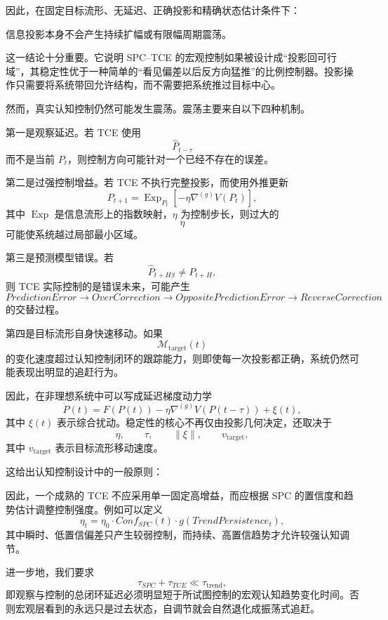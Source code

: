 因此，在固定目标流形、无延迟、正确投影和精确状态估计条件下：
\begin{statementbox}
信息投影本身不会产生持续扩幅或有限幅周期震荡。
\end{statementbox}

这一结论十分重要。它说明 SPC--TCE 的宏观控制如果被设计成``投影回可行域''，其稳定性优于一种简单的``看见偏差以后反方向猛推''的比例控制器。投影操作只需要将系统带回允许结构，而不需要把系统推过目标中心。

然而，真实认知控制仍然可能发生震荡。震荡主要来自以下四种机制。

第一是观察延迟。若 TCE 使用
\[
\hat P_{t-\tau}
\]
而不是当前 $P_t$，则控制方向可能针对一个已经不存在的误差。

第二是过强控制增益。若 TCE 不执行完整投影，而使用外推更新
\[
P_{t+1}
=
\operatorname{Exp}_{P_t}
\left[
-\eta
\nabla^{(g)}
V(P_t)
\right],
\]
其中 $\operatorname{Exp}$ 是信息流形上的指数映射，$\eta$ 为控制步长，则过大的
\[
\eta
\]
可能使系统越过局部最小区域。

第三是预测模型错误。若
\[
\widehat P_{t+H|t}
\neq
P_{t+H},
\]
则 TCE 实际控制的是错误未来，可能产生
\[
PredictionError
\rightarrow
OverCorrection
\rightarrow
OppositePredictionError
\rightarrow
ReverseCorrection
\]
的交替过程。

第四是目标流形自身快速移动。如果
\[
\mathcal{M}_{\mathrm{target}}(t)
\]
的变化速度超过认知控制闭环的跟踪能力，则即使每一次投影都正确，系统仍然可能表现出明显的追赶行为。

因此，在非理想系统中可以写成延迟梯度动力学
\[
\dot P(t)
=
F(P(t))
-
\eta
\nabla^{(g)}
V
\left(
P(t-\tau)
\right)
+
\xi(t),
\]
其中 $\xi(t)$ 表示综合扰动。稳定性的核心不再仅由投影几何决定，还取决于
\[
\eta,
\qquad
\tau,
\qquad
\|\xi\|,
\qquad
v_{\mathrm{target}},
\]
其中 $v_{\mathrm{target}}$ 表示目标流形移动速度。

这给出认知控制设计中的一般原则：
\begin{statementbox}
\centering
{}
\end{statementbox}

因此，一个成熟的 TCE 不应采用单一固定高增益，而应根据 SPC 的置信度和趋势估计调整控制强度。例如可以定义
\[
\eta_t
=
\eta_0
\cdot
Conf_{SPC}(t)
\cdot
g
\left(
TrendPersistence_t
\right),
\]
其中瞬时、低置信偏差只产生较弱控制，而持续、高置信趋势才允许较强认知调节。

进一步地，我们要求
\[
\tau_{SPC}+\tau_{TCE}
\ll
\tau_{\mathrm{trend}},
\]
即观察与控制的总闭环延迟必须明显短于所试图控制的宏观认知趋势变化时间。否则宏观层看到的永远只是过去状态，自调节就会自然退化成振荡式追赶。

